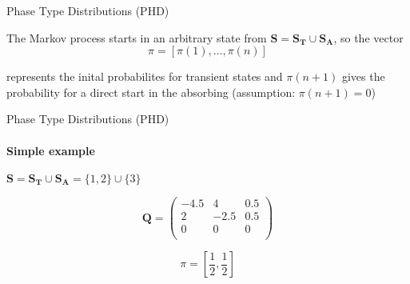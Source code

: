 \documentclass[envcountset]{beamer}
\theoremstyle{definition}
\begin{document}
\begin{frame}{Phase Type Distributions (PHD)}

The Markov process starts in an arbitrary state from $\mathbf{S}=\mathbf{S_T} \cup \mathbf{S_A}$, so the vector 
$$\pi=[\pi(1),\ldots,\pi(n)]$$

represents the inital probabilites for transient states and $\pi(n+1)$ gives the probability for a direct start in the absorbing (assumption: $\pi(n+1)=0$)
\end{frame}

\begin{frame}{Phase Type Distributions (PHD)}
\framesubtitle{Simple example}

$\mathbf{S}=\mathbf{S_T} \cup \mathbf{S_A} = \{1,2\} \cup \{3\}$

\begin{minipage}[c]{0.45\textwidth}
	\begin{minipage}[c]{1.\textwidth}
	\begin{equation*}
	\mathbf{Q} =
	\left(
	\begin{array}{cc|c}
	-4.5 & 4 & 0.5 \\
	2 & -2.5 &0.5\\
	\hline
	0 &0 &0 \\
	\end{array}
	\right)
	\end{equation*}
	\end{minipage}
	\vfill
	\begin{minipage}{1.\textwidth}
	\flushright
	\begin{equation*}
	\pi=[\frac{1}{2},  \frac{1}{2}]
	\end{equation*}
	\end{minipage}
\end{minipage}
\hfill
\begin{minipage}[c]{0.45\textwidth}
\end{minipage}

\end{frame}
\end{document}
